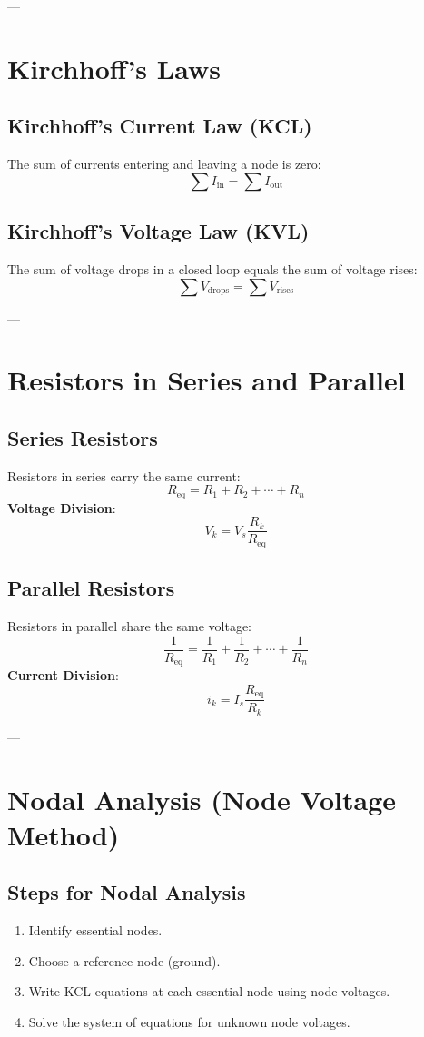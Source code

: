 \documentclass[9pt]{article}
\begin{document}
\begin{multicols*}{2}
--- 

\section{Kirchhoff’s Laws}

\subsection{Kirchhoff's Current Law (KCL)}
The sum of currents entering and leaving a node is zero:
\[ \sum I_{\text{in}} = \sum I_{\text{out}} \]

\subsection{Kirchhoff's Voltage Law (KVL)}
The sum of voltage drops in a closed loop equals the sum of voltage rises:
\[ \sum V_{\text{drops}} = \sum V_{\text{rises}} \]

--- 

\section{Resistors in Series and Parallel}

\subsection{Series Resistors}
Resistors in series carry the same current:
\[ R_{\text{eq}} = R_1 + R_2 + \cdots + R_n \]
\textbf{Voltage Division}:
\[ V_k = V_s \frac{R_k}{R_{\text{eq}}} \]

\subsection{Parallel Resistors}
Resistors in parallel share the same voltage:
\[ \frac{1}{R_{\text{eq}}} = \frac{1}{R_1} + \frac{1}{R_2} + \cdots + \frac{1}{R_n} \]
\textbf{Current Division}:
\[ i_k = I_s \frac{R_{\text{eq}}}{R_k} \]

--- 

\section{Nodal Analysis (Node Voltage Method)}

\subsection{Steps for Nodal Analysis}
\begin{enumerate}\itemsep0pt
    \item Identify essential nodes.
    \item Choose a reference node (ground).
    \item Write KCL equations at each essential node using node voltages.
    \item Solve the system of equations for unknown node voltages.
\end{enumerate}


\end{multicols*}
\end{document}
